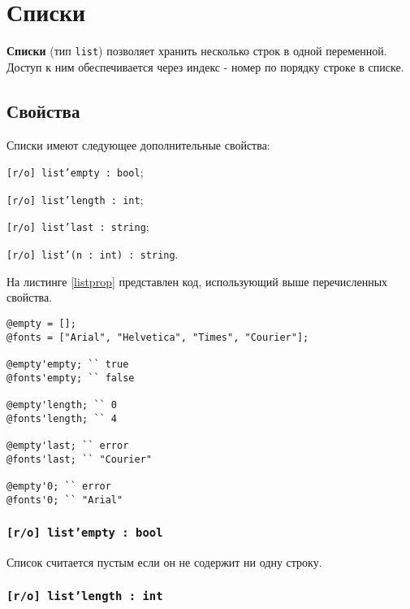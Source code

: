 \section{Списки}

{\bf Списки} (тип \texttt{list}) позволяет хранить несколько строк в одной переменной. Доступ к ним обеспечивается через индекс - номер по порядку строке в списке.

\subsection{Свойства}

Списки имеют следующее дополнительные свойства:
\begin{icItems}
\item
	\texttt{[r/o] list'empty : bool};
\item
	\texttt{[r/o] list'length : int};
\item
	\texttt{[r/o] list'last : string};
\item
	\texttt{[r/o] list'(n : int) : string}.
\end{icItems}

На листинге \ref{listprop} представлен код, использующий выше перечисленных свойства.

\begin{sourcecode}
\label{listprop}
\begin{verbatim}
@empty = [];
@fonts = ["Arial", "Helvetica", "Times", "Courier"];

@empty'empty; `` true
@fonts'empty; `` false

@empty'length; `` 0
@fonts'length; `` 4

@empty'last; `` error
@fonts'last; `` "Courier"

@empty'0; `` error
@fonts'0; `` "Arial"
\end{verbatim}
\end{sourcecode}

\subsubsection{\texttt{[r/o] list'empty : bool}}

Список считается пустым если он не содержит ни одну строку.

\subsubsection{\texttt{[r/o] list'length : int}}

